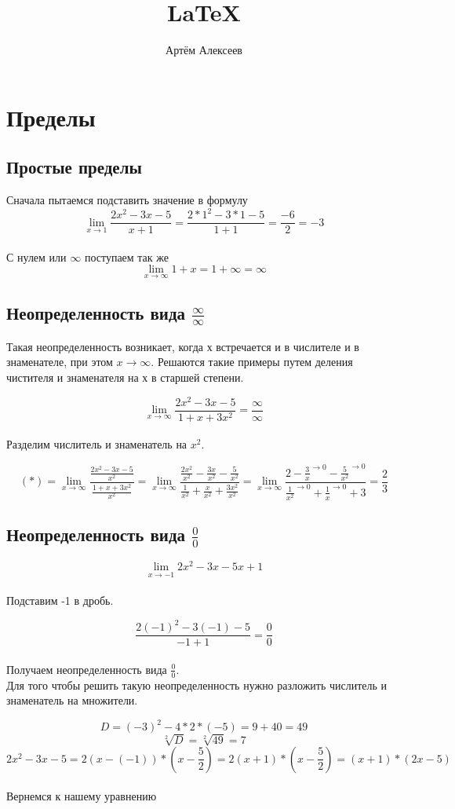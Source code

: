 \documentclass[12pt,a4paper]{article}
\title{\LaTeX}
\date{}
\author{Артём Алексеев}
\begin{document}
  

\section{Пределы}
\subsection{Простые пределы}

Сначала пытаемся подставить значение в формулу
$$\lim_{x \to 1}\frac{2x^2-3x-5}{x+1} = \frac{2*1^2-3*1-5}{1+1} = \frac{-6}{2} = -3$$
\\
С нулем или $\infty$ поступаем так же
$$\lim_{x \to \infty}1+x = 1 + \infty = \infty$$

\subsection{Неопределенность вида $\frac{\infty}{\infty}$}

Такая неопределенность возникает, когда х встречается и в числителе и в знаменателе, при этом $x \to \infty$.
Решаются такие примеры путем деления чистителя и знаменателя на х в старшей степени.

$$\lim_{x \to \infty}\frac{2x^2-3x-5}{1+x+3x^2} = \frac{\infty}{\infty}$$
\\
Разделим числитель и знаменатель на $x^2$.

$$(*) 
= \lim_{x \to \infty}\frac{\frac{2x^2-3x-5}{x^2}}{\frac{1+x+3x^2}{x^2}}
= \lim_{x \to \infty}\frac{\frac{2x^2}{x^2}-\frac{3x}{x^2}-\frac{5}{x^2}}{\frac{1}{x^2} + \frac{x}{x^2} + \frac{3x^2}{x^2}}
= \lim_{x \to \infty}\frac{2-\frac{3}{x}^{\to 0}-\frac{5}{x^2}^{\to 0}}{\frac{1}{x^2}^{\to 0} + \frac{1}{x}^{\to 0} + 3}
= \frac{2}{3}
$$

\subsection{Неопределенность вида $\frac{0}{0}$}

$$\lim_{x \to -1}{2x^2-3x-5}{x+1}$$
\\
Подставим -1 в дробь.

$$\frac{2(-1)^2-3(-1)-5}{-1+1}=\frac{0}{0}$$
\\
Получаем неопределенность вида $\frac{0}{0}$. 
\\
Для того чтобы решить такую неопределенность нужно разложить числитель и знаменатель на множители.

$$ D = (-3)^2-4*2*(-5) = 9+40 = 49 $$
$$ \sqrt[2]{D} = \sqrt[2]{49} = 7 $$
$$ 2x^2-3x-5=2(x-(-1))*(x-\frac{5}{2})=2(x+1)*(x-\frac{5}{2})=(x+1)*(2x-5) $$
\\
Вернемся к нашему уравнению
\end{document}

